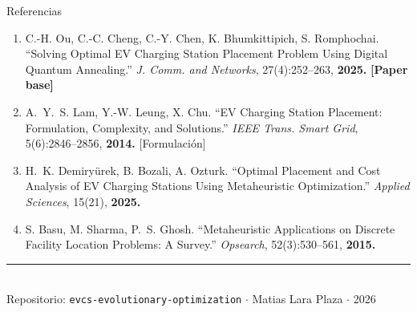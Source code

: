 \documentclass[aspectratio=169, 12pt]{beamer}
\newcommand{\acento}[1]{\textcolor{Verde}{\textbf{#1}}}
\newcommand{\acentob}[1]{\textcolor{Cian}{#1}}
\newcommand{\gris}[1]{\textcolor{GrisAzul}{#1}}
\begin{document}
\begin{frame}{Referencias}
  \begin{enumerate}\footnotesize
    \item \textcolor{BlancoCool}{C.-H. Ou, C.-C. Cheng, C.-Y. Chen, K. Bhumkittipich, S. Romphochai.}
      \gris{``Solving Optimal EV Charging Station Placement Problem Using Digital Quantum Annealing.''}
      \textit{J. Comm. and Networks}, 27(4):252--263, \textbf{2025.}
      \hfill\acento{[Paper base]}

    \vspace{0.15em}
    \item \textcolor{BlancoCool}{A.~Y.~S. Lam, Y.-W. Leung, X. Chu.}
      \gris{``EV Charging Station Placement: Formulation, Complexity, and Solutions.''}
      \textit{IEEE Trans. Smart Grid}, 5(6):2846--2856, \textbf{2014.}
      \hfill\acentob{[Formulación]}

    \vspace{0.15em}
    \item \textcolor{BlancoCool}{H.~K. Demiryürek, B. Bozali, A. Ozturk.}
      \gris{``Optimal Placement and Cost Analysis of EV Charging Stations Using Metaheuristic Optimization.''}
      \textit{Applied Sciences}, 15(21), \textbf{2025.}

    \vspace{0.15em}
    \item \textcolor{BlancoCool}{S. Basu, M. Sharma, P.~S. Ghosh.}
      \gris{``Metaheuristic Applications on Discrete Facility Location Problems: A Survey.''}
      \textit{Opsearch}, 52(3):530--561, \textbf{2015.}
  \end{enumerate}

  \vspace{0.2em}
  \begin{center}
    \textcolor{Cian}{\rule{0.75\textwidth}{0.4pt}}\\[0.2em]
    \gris{\footnotesize Repositorio: \texttt{evcs-evolutionary-optimization} $\cdot$ Matias Lara Plaza $\cdot$ 2026}
  \end{center}
\end{frame}

\maketitle
\end{document}
